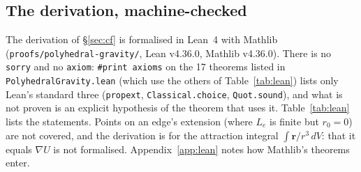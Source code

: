 \documentclass[10pt,a4paper]{article}
\newcommand{\vr}{\mathbf{r}}
\begin{document}
\subsection{The derivation, machine-checked}\label{sec:lean}

The derivation of \S\ref{sec:cf} is formalised in Lean~4 \citep{moura2021} with Mathlib
\citep{mathlib2020} (\texttt{proofs/polyhedral-gravity/}, Lean v4.36.0, Mathlib v4.36.0). There is no
\texttt{sorry} and no \texttt{axiom}: \texttt{\#print axioms} on the 17 theorems listed in
\texttt{PolyhedralGravity.lean} (which use the others of Table~\ref{tab:lean}) lists only Lean's
standard three (\texttt{propext}, \texttt{Classical.choice}, \texttt{Quot.sound}), and what is not
proven is an explicit hypothesis of the theorem that uses it. Table~\ref{tab:lean} lists the
statements. Points on an edge's extension (where $L_e$ is finite but $r_0=0$) are not covered, and the
derivation is for the attraction integral $\int\vr/r^3\,dV$: that it equals $\nabla U$ is not
formalised. Appendix~\ref{app:lean} notes how Mathlib's theorems enter.
\end{document}
